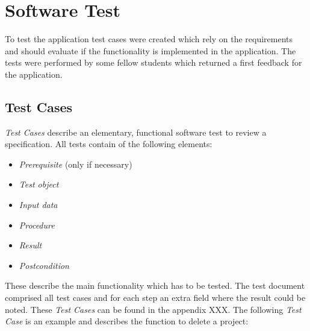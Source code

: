 \chapter{Software Test}

To test the application test cases were created which rely on the requirements and should evaluate if the functionality is implemented in the application. The tests were performed by some fellow students which returned a first feedback for the application.

\section{Test Cases}

\textit{Test Cases} describe an elementary, functional software test to review a specification. All tests contain of the following elements:
\begin{itemize}
	\item \textit{Prerequisite} (only if necessary)
	\item \textit{Test object}
	\item \textit{Input data}
	\item \textit{Procedure}
	\item \textit{Result}
	\item \textit{Postcondition}
\end{itemize}
These describe the main functionality which has to be tested. The test document comprised all test cases and for each step an extra field where the result could be noted. These \textit{Test Cases} can be found in the appendix XXX. The following \textit{Test Case} is an example and describes the function to delete a project:

